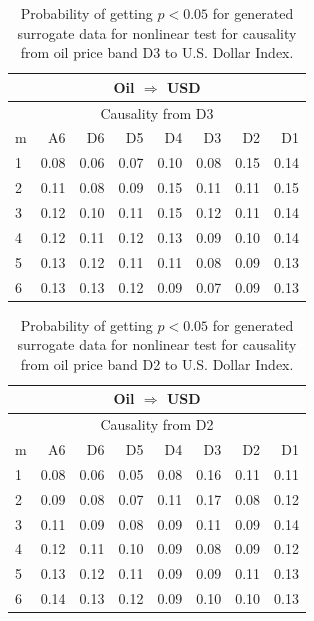 %
%
\begin{table}[H]
\begin{center}
\begin{tabular}{l|r r r r r r r}
\hline\hline
\multicolumn{8}{c}{Oil $\Rightarrow$ USD}\\
\hline
\multicolumn{8}{c}{Causality from D3}\\
\hline\hline
m & A6 & D6 & D5 & D4 & D3 & D2 & D1 \\
\hline
1 & 0.08 & 0.06 & 0.07 & 0.10 & 0.08 & 0.15 & 0.14 \\
2 & 0.11 & 0.08 & 0.09 & 0.15 & 0.11 & 0.11 & 0.15 \\
3 & 0.12 & 0.10 & 0.11 & 0.15 & 0.12 & 0.11 & 0.14 \\
4 & 0.12 & 0.11 & 0.12 & 0.13 & 0.09 & 0.10 & 0.14 \\
5 & 0.13 & 0.12 & 0.11 & 0.11 & 0.08 & 0.09 & 0.13 \\
6 & 0.13 & 0.13 & 0.12 & 0.09 & 0.07 & 0.09 & 0.13 \\
\hline\hline
\end{tabular}
\caption{Probability of getting $p < 0.05$ for generated surrogate data for nonlinear test for causality from oil price band D3 to U.S. Dollar Index.}
\end{center}
\end{table}

%
%
\begin{table}[H]
\begin{center}
\begin{tabular}{l|r r r r r r r}
\hline\hline
\multicolumn{8}{c}{Oil $\Rightarrow$ USD}\\
\hline
\multicolumn{8}{c}{Causality from D2}\\
\hline\hline
m & A6 & D6 & D5 & D4 & D3 & D2 & D1 \\
\hline
1 & 0.08 & 0.06 & 0.05 & 0.08 & 0.16 & 0.11 & 0.11 \\
2 & 0.09 & 0.08 & 0.07 & 0.11 & 0.17 & 0.08 & 0.12 \\
3 & 0.11 & 0.09 & 0.08 & 0.09 & 0.11 & 0.09 & 0.14 \\
4 & 0.12 & 0.11 & 0.10 & 0.09 & 0.08 & 0.09 & 0.12 \\
5 & 0.13 & 0.12 & 0.11 & 0.09 & 0.09 & 0.11 & 0.13 \\
6 & 0.14 & 0.13 & 0.12 & 0.09 & 0.10 & 0.10 & 0.13 \\
\hline\hline
\end{tabular}
\caption{Probability of getting $p < 0.05$ for generated surrogate data for nonlinear test for causality from oil price band D2 to U.S. Dollar Index.}
\end{center}
\end{table}

